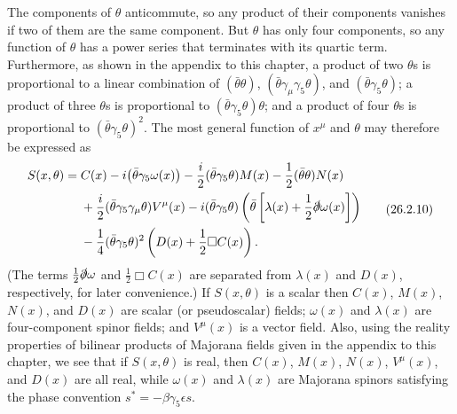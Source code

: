 The components of $\theta$ anticommute, so any product of their components
vanishes if two of them are the same component. But $\theta$ has only four
components, so any function of $\theta$ has a power series that terminates
with its quartic term. Furthermore, as shown in the appendix to this chapter,
a product of two $\theta$s is proportional to a linear combination of
$(\bar\theta\theta)$, $(\bar\theta\gamma_\mu\gamma_5\theta)$, and
$(\bar\theta\gamma_5\theta)$; a product of three $\theta$s is proportional to
$(\bar\theta\gamma_5\theta)\theta$; and a product of four $\theta$s is
proportional to $(\bar\theta\gamma_5\theta)^2$. The most general function of
$x^\mu$ and $\theta$ may therefore be expressed as
\begin{equation}
  \begin{aligned}
  S(x,\theta)={}&C(x)-i\bigl(\bar\theta\gamma_5\omega(x)\bigr)
  -\frac{i}{2}(\bar\theta\gamma_5\theta)M(x)
  -\frac{1}{2}(\bar\theta\theta)N(x)\\
  &+\frac{i}{2}(\bar\theta\gamma_5\gamma_\mu\theta)V^\mu(x)
  -i(\bar\theta\gamma_5\theta)
    \left(\bar\theta\left[\lambda(x)+\frac{1}{2}\sl{\partial}\omega(x)\right]\right)\\
  &-\frac{1}{4}(\bar\theta\gamma_5\theta)^2
    \left(D(x)+\frac{1}{2}\Box C(x)\right).
  \end{aligned}
  \tag{26.2.10}\label{eq:26.2.10}
\end{equation}
(The terms $\frac12\sl{\partial}\omega$ and $\frac12\Box C(x)$ are separated
from $\lambda(x)$ and $D(x)$, respectively, for later convenience.) If
$S(x,\theta)$ is a scalar then $C(x)$, $M(x)$, $N(x)$, and $D(x)$ are scalar
(or pseudoscalar) fields; $\omega(x)$ and $\lambda(x)$ are four-component
spinor fields; and $V^\mu(x)$ is a vector field. Also, using the reality
properties of bilinear products of Majorana fields given in the appendix to
this chapter, we see that if $S(x,\theta)$ is real, then $C(x)$, $M(x)$,
$N(x)$, $V^\mu(x)$, and $D(x)$ are all real, while $\omega(x)$ and
$\lambda(x)$ are Majorana spinors satisfying the phase convention
$s^*=-\beta\gamma_5\epsilon s$.

